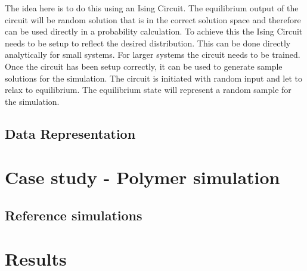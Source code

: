 \documentclass[11pt]{article}
\begin{document}
The idea here is to do this using an Ising Circuit. The equilibrium output of the circuit will be random solution that is in the correct solution space and therefore can be used directly in a probability calculation. To achieve this the Ising Circuit needs to be setup to reflect the desired distribution. This can be done directly analytically for small systems. For larger systems the circuit needs to be trained. Once the circuit has been setup correctly, it can be used to generate sample solutions for the simulation. The circuit is initiated with random input and let to relax to equilibrium. The equilibrium state will represent a random sample for the simulation.

\subsection{Data Representation}

\section{Case study - Polymer simulation}
\subsection{Reference simulations}


\section{Results}


\end{document}
